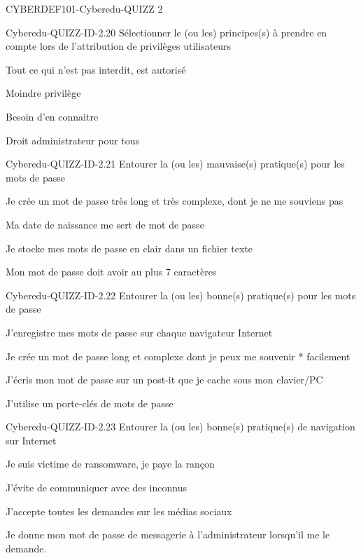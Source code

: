 \documentclass[12pt]{article}
\begin{document}
\begin{quiz}{CYBERDEF101-Cyberedu-QUIZZ 2}
\begin{multi}[multiple=true]{Cyberedu-QUIZZ-ID-2.20}
	S\'electionner le (ou les) principes(s) \`{a} prendre en compte lors de l'attribution de privil\`eges utilisateurs
\item  Tout ce qui n'est pas interdit, est autoris\'e
\item*  Moindre privil\`ege
\item*  Besoin d'en connaitre
\item  Droit administrateur pour tous
\end{multi}

\begin{multi}[multiple=true]{Cyberedu-QUIZZ-ID-2.21}
	Entourer la (ou les) mauvaise(s) pratique(s) pour les mots de passe
\item* Je cr\'ee un mot de passe tr\`es long et tr\`es complexe, dont je ne me souviens pas
\item* Ma date de naissance me sert de mot de passe
\item* Je stocke mes mots de passe en clair dans un fichier texte
\item* Mon mot de passe doit avoir au plus 7 caract\`eres
\end{multi}

\begin{multi}[multiple=true]{Cyberedu-QUIZZ-ID-2.22}
	Entourer la (ou les) bonne(s) pratique(s) pour les mots de passe
\item J'enregistre mes mots de passe sur chaque navigateur Internet
\item* Je cr\'ee un mot de passe long et complexe dont je peux me souvenir * facilement
\item J'\'ecris mon mot de passe sur un post-it que je cache sous mon clavier/PC
\item* J'utilise un porte-cl\'es de mots de passe
\end{multi}

\begin{multi}[multiple=true]{Cyberedu-QUIZZ-ID-2.23}
	Entourer la (ou les) bonne(s) pratique(s) de navigation sur Internet
\item Je suis victime de ransomware, je paye la ran\c{c}on
\item* J'\'evite de communiquer avec des inconnus
\item J'accepte toutes les demandes sur les m\'edias sociaux
\item Je donne mon mot de passe de messagerie \`{a}  l'administrateur   lorsqu'il me le demande.
\end{multi}


\end{quiz}
\end{document}
